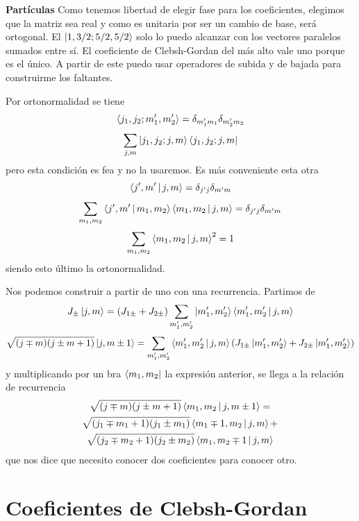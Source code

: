 \documentclass[10pt,oneside]{CBFT_book}
\begin{document}
\begin{ejemplo}{\bf Partículas}
Como tenemos libertad de elegir fase para los coeficientes, elegimos que la matriz sea real
y como es unitaria por ser un cambio de base, será ortogonal.
El $\Ket{1,3/2;5/2,5/2}$ solo lo puedo alcanzar con los vectores paralelos sumados entre sí.
El coeficiente de Clebsh-Gordan del más alto vale uno porque es el único. A partir de este
puedo usar operadores de subida y de bajada para construirme los faltantes.\

Por ortonormalidad se tiene
\[
	\Braket{ j_1, j_2 ; m_1', m_2' } = \delta_{m_1' m_1}  \delta_{m_2' m_2}
\]
\[
	\sum_{j,m} \Ket{ j_1, j_2 ; j, m }\Bra{ j_1, j_2 ; j, m }
\]
pero esta condición es fea y no la usaremos.
Es más conveniente esta otra
\[
	\Braket{j',m'|j,m} = \delta_{j'j}\delta_{m'm}
\]
\[
	\sum_{m_1,m_2} \Braket{j',m'|m_1,m_2}\Braket{m_1,m_2|j,m} = \delta_{j'j}\delta_{m'm}
\]
\[
	\sum_{m_1,m_2} \Braket{m_1,m_2|j,m}^2 = 1
\]
siendo esto último la ortonormalidad.

Nos podemos construir a partir de uno con una recurrencia. Partimos de
\[
	J_\pm \ket{j,m} = ( J_{1\pm} + J_{2\pm} ) \sum_{m_1',m_2'} \Ket{m_1',m_2'}\Braket{m_1',m_2'|j,m}
\]
\[
	\sqrt{(j\mp m)(j\pm m + 1)} \ket{j,m\pm 1} = \sum_{m_1',m_2'}\Braket{m_1',m_2'|j,m}  
	( J_{1\pm}\Ket{m_1',m_2'} + J_{2\pm}\Ket{m_1',m_2'} ) 
\]
y multiplicando por un bra $\Bra{m_1,m_2}$ la expresión anterior, se llega a la relación de recurrencia
\begin{multline*}
	\sqrt{(j\mp m)(j\pm m + 1)} \Braket{m_1,m_2|j,m\pm 1} = \\
	\sqrt{(j_1 \mp m_1 + 1 )(j_1 \pm m_1)} \Braket{m_1 \mp 1 ,m_2|j,m}  + \\
	\sqrt{(j_2 \mp m_2 + 1 )(j_2 \pm m_2)}  \Braket{m_1,m_2 \mp 1| j,m } 
\end{multline*}
que nos dice que necesito conocer dos coeficientes para conocer otro.
 
\end{ejemplo}
% 


\section{Coeficientes de Clebsh-Gordan}
\end{document}
